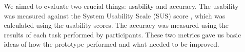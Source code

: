 We aimed to evaluate two crucial things: usability and accuracy. The usability was measured against the System Usability Scale (SUS) score \cite{susscores}, which was calculated using the usability scores. The accuracy was measured using the results of each task performed by participants. These two metrics gave us basic ideas of how the prototype performed and what needed to be improved.


